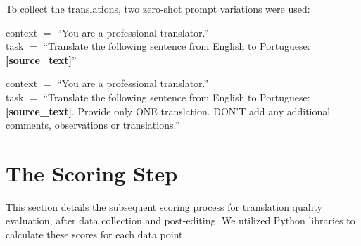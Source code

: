 To collect the translations, two zero-shot prompt variations were used:


\begin{promptbox}
context  $=$ ``You are a professional translator.'' \\
task $=$ ``Translate the following sentence from English to Portuguese: \textbf{[source\_text]}'' 
\end{promptbox}


\begin{promptbox1}
context  $=$ ``You are a professional translator.'' \\
task $=$ ``Translate the following sentence from English to Portuguese: \textbf{[source\_text]}. Provide only ONE translation. DON'T add any additional comments, observations or translations.''
\end{promptbox1}


\section{The Scoring Step}

This section details the subsequent scoring process for translation quality evaluation, after data collection and post-editing. We utilized Python libraries to calculate these scores for each data point.



